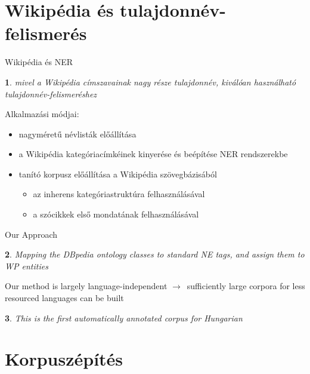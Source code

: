 \documentclass[utf8x,t]{beamer}
\newcommand{\nyil}{$\rightarrow$\ }
\newtheorem{nix}{}[section]
\begin{document}
\section{Wikipédia és tulajdonnév-felismerés}

\begin{frame}{Wikipédia és NER}

\bigskip

\begin{nix}
mivel a Wikipédia címszavainak nagy része tulajdonnév, kiválóan használható tulajdonnév-felismeréshez
\end{nix}

\bigskip

Alkalmazási módjai:
\smallskip
\begin{itemize}
\item nagyméretű névlisták előállítása 
\item a Wikipédia kategóriacímkéinek kinyerése és beépítése NER rendszerekbe
\item tanító korpusz előállítása a Wikipédia szövegbázisából
\begin{itemize}
\item az inherens kategóriastruktúra felhasználásával
\item a szócikkek első mondatának felhasználásával
\end{itemize} 
\end{itemize}

\end{frame}

\begin{frame}{Our Approach}

\begin{nix}
Mapping the DBpedia ontology classes to standard NE tags, and assign them to WP entities
\end{nix}

\bigskip

Our method is largely language-independent \nyil sufficiently large corpora for less resourced languages can be built 

\bigskip

\begin{nix}
This is the first automatically annotated corpus for Hungarian 
\end{nix}

\end{frame}

\section{Korpuszépítés}
\end{document}
